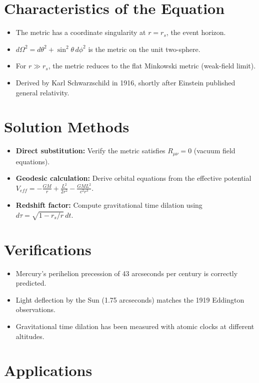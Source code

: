 \section*{Characteristics of the Equation}

\begin{itemize}
    \item The metric has a coordinate singularity at $r = r_s$, the event horizon.
    \item $d\Omega^2 = d\theta^2 + \sin^2\theta\,d\phi^2$ is the metric on the unit two-sphere.
    \item For $r \gg r_s$, the metric reduces to the flat Minkowski metric (weak-field limit).
    \item Derived by Karl Schwarzschild in 1916, shortly after Einstein published general relativity.
\end{itemize}
\section*{Solution Methods}

\begin{itemize}
    \item \textbf{Direct substitution:} Verify the metric satisfies $R_{\mu\nu} = 0$ (vacuum field equations).
    \item \textbf{Geodesic calculation:} Derive orbital equations from the effective potential $V_{eff} = -\frac{GM}{r} + \frac{L^2}{2r^2} - \frac{GML^2}{c^2r^3}$.
    \item \textbf{Redshift factor:} Compute gravitational time dilation using $d\tau = \sqrt{1 - r_s/r}\,dt$.
\end{itemize}
\section*{Verifications}

\begin{itemize}
    \item Mercury's perihelion precession of 43 arcseconds per century is correctly predicted.
    \item Light deflection by the Sun (1.75 arcseconds) matches the 1919 Eddington observations.
    \item Gravitational time dilation has been measured with atomic clocks at different altitudes.
\end{itemize}
\section*{Applications}

